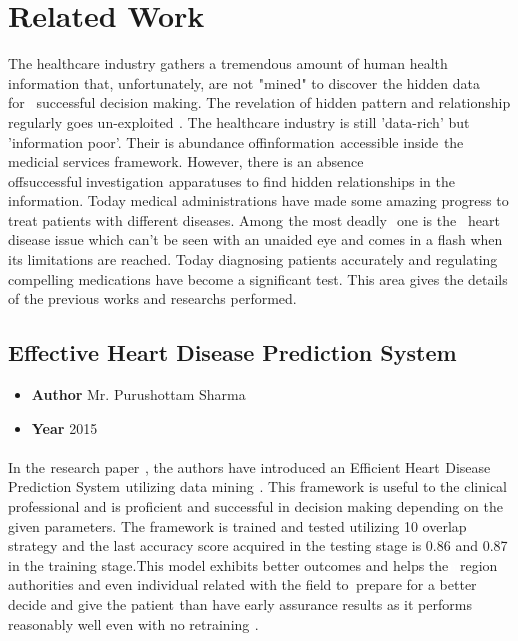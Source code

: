 \documentclass[oneside,12pt]{Classes/VTU}
\begin{document}
    
    \section{Related Work}
    The healthcare industry gathers a tremendous amount of human health information that, unfortunately, are\tiny\textcolor{white}{s}\normalsize not\tiny\textcolor{white}{s}\normalsize "mined" to discover\tiny\textcolor{white}{s}\normalsize the hidden data for\tiny\textcolor{white}{m}\normalsize successful decision making. The revelation of hidden pattern and relationship regularly goes un-exploited\tiny\textcolor{white}{s}\normalsize. The healthcare industry is still 'data-rich' but 'information poor'. Their is abundance of\tiny\textcolor{white}{f}\normalsize information\tiny\textcolor{white}{s}\normalsize accessible inside\tiny\textcolor{white}{s}\normalsize the medicial services framework. However, there is an absence of\tiny\textcolor{white}{f}\normalsize successful\tiny\textcolor{white}{l}\normalsize investigation\tiny\textcolor{white}{s}\normalsize apparatuses to find hidden relationships in the information. Today medical administrations have made some amazing progress to treat patients with different diseases. Among\tiny\textcolor{white}{s}\normalsize the most deadly \tiny\textcolor{white}{t}\normalsize one is the\tiny\textcolor{white}{m}\normalsize heart disease issue which can't be seen with an unaided eye and comes in a flash when its limitations are reached. Today diagnosing patients accurately and regulating compelling medications have become a significant test. This area gives the details of the previous works and researchs performed.
    \subsection{Effective Heart Disease Prediction System}
    \begin{itemize}
    	\item \textbf{Author} Mr. Purushottam Sharma
    	\item \textbf{Year} 2015
    \end{itemize}
	\paragraph{}
    In the\tiny\textcolor{white}{s}\normalsize research paper\tiny\textcolor{white}{s}\normalsize, the authors have introduced an Efficient Heart\tiny\textcolor{white}{s}\normalsize Disease Prediction System\tiny\textcolor{white}{s}\normalsize utilizing data mining\tiny\textcolor{white}{s}\normalsize. This framework is useful to the clinical professional and is proficient and successful in decision making depending on the given parameters. The framework is trained and tested utilizing 10 overlap strategy and the last accuracy score acquired in the testing stage is 0.86 and 0.87 in the training stage.This model exhibits better outcomes and helps the\tiny\textcolor{white}{m}\normalsize region authorities and even individual related with the field to\tiny\textcolor{white}{o}\normalsize prepare for a better decide and give the patient\tiny\textcolor{white}{s}\normalsize than have early assurance results as it performs reasonably well even with no retraining\tiny\textcolor{white}{s}\normalsize.
   
\end{document}
